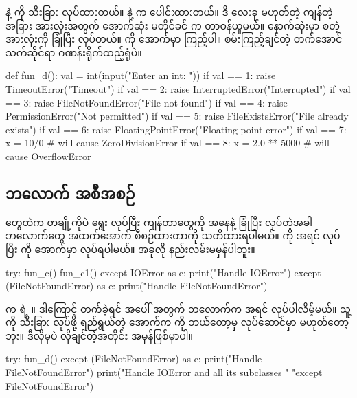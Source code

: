 %
 နဲ့  ကို သီးခြား  လုပ်ထားတယ်။  နဲ့  က ပေါင်းထားတယ်။ ဒီ လေးခု မဟုတ်တဲ့ ကျန်တဲ့ အခြား  အားလုံးအတွက် အောက်ဆုံး မတိုင်ခင်  က တာဝန်ယူမယ်။ နောက်ဆုံးမှာ \fEn{,}  စတဲ့  အားလုံးကို ခြုံပြီး  လုပ်တယ်။  ကို အောက်မှာ ကြည့်ပါ။ စမ်းကြည့်ချင်တဲ့  တက်အောင် သက်ဆိုင်ရာ ဂဏန်းရိုက်ထည့်ရုံပဲ။
%
\begin{py}
def fun_d():
    val = int(input("Enter an int: "))
    if val == 1:
        raise TimeoutError("Timeout")
    if val == 2:
        raise InterruptedError("Interrupted")
    if val == 3:
        raise FileNotFoundError("File not found")
    if val == 4:
        raise PermissionError("Not permitted")
    if val == 5:
        raise FileExistsError("File already exists")
    if val == 6:
        raise FloatingPointError("Floating point error")
    if val == 7:
        x = 10/0         # will cause ZeroDivisionError
    if val == 8:
        x = 2.0 ** 5000  # will cause OverflowError
\end{py}

\subsection*{ ဘလောက် အစီအစဉ်}
 တွေထဲက တချို့ကိုပဲ ရွေး  လုပ်ပြီး ကျန်တာတွေကို   အနေနဲ့ ခြုံပြီး  လုပ်တဲ့အခါ  ဘလောက်တွေ အထက်အောက် စီစဉ်ထားတာကို သတိထားရပါမယ်။  ကို အရင်  လုပ်ပြီး  ကို  အောက်မှာ လုပ်ရပါမယ်။ အခုလို  နည်းလမ်းမမှန်ပါဘူး။
%
\begin{py}
try:
    fun_c()
    fun_c1()
except IOError as e:
    print("Handle IOError")
except (FileNotFoundError) as e:
    print("Handle FileNotFoundError")
\end{py}
%
 က  ရဲ့  ။ ဒါကြောင့်  တက်ခဲ့ရင် အပေါ်  အတွက်  ဘလောက်က အရင်  လုပ်ပါလိမ့်မယ်။ သူ့ကို သီးခြား  လုပ်ဖို့ ရည်ရွယ်တဲ့ အောက်က  ကို ဘယ်တော့မှ လုပ်ဆောင်မှာ မဟုတ်တော့ဘူး။ ဒီလိုမှပဲ လိုချင်တဲ့အတိုင်း အမှန်ဖြစ်မှာပါ။
%
\begin{py}
try:
    fun_d()
except (FileNotFoundError) as e:
    print("Handle FileNotFoundError")
print("Handle IOError and all its subclasses "
      "except FileNotFoundError")
\end{py}
%

